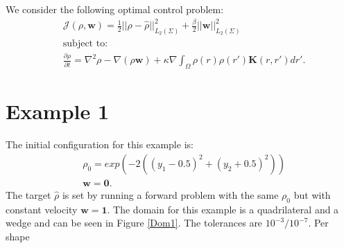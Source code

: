\documentclass[11pt, a4paper]{article}
\theoremstyle{definition}
\newcommand{\w}{\mathbf{w}}
\newcommand{\K}{\mathbf{K}}
\begin{document}
We consider the following optimal control problem:
\begin{align*}
&\mathcal{J}(\rho, \w) = \frac{1}{2}|| \rho - \widehat \rho||^2_{L_2(\Sigma)} + \frac{\beta}{2}|| \w ||^2_{L_2(\Sigma)}\\
&\text{subject to:}\\
&\frac{\partial \rho}{\partial t} = \nabla^2 \rho - \nabla (\rho \w) + \kappa \nabla \int_\Omega \rho(r) \rho(r') \K(r,r') dr'.
\end{align*}

\section{Example 1}
The initial configuration for this example is:
\begin{align*}
&\rho_0 = exp(-2((y_1 - 0.5 )^2 + (y_2 + 0.5)^2))\\
&\w = \mathbf 0.
\end{align*}
The target $\widehat \rho$ is set by running a forward problem with the same $\rho_0$ but with constant velocity $\w = \mathbf{1}$.
The domain for this example is a quadrilateral and a wedge and can be seen in Figure \ref{Dom1}. The tolerances are $10^{-3}/ 10^{-7}$. Per shape 
\end{document}
